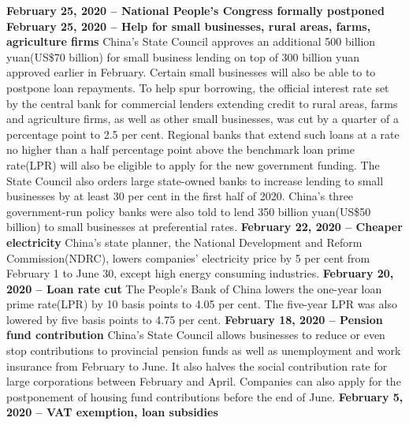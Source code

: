\documentclass[11pt, a4paper]{article}
\begin{document}
            \bigbreak
            \noindent
            \textbf{February 25, 2020 – National People’s Congress formally postponed}
            \bigbreak
            \noindent
            \textbf{\Large February 25, 2020 – Help for small businesses, rural areas, farms, agriculture firms}
            \bigbreak
            China’s State Council approves an additional 500 billion yuan(US\$70 billion) for small business lending on top of 300 billion yuan approved earlier in February. Certain small businesses will also be able to to postpone loan repayments.
            \bigbreak
            To help spur borrowing, the official interest rate set by the central bank for commercial lenders extending credit to rural areas, farms and agriculture firms, as well as other small businesses, was cut by a quarter of a percentage point to 2.5 per cent. Regional banks that extend such loans at a rate no higher than a half percentage point above the benchmark loan prime rate(LPR) will also be eligible to apply for the new government funding.
            \bigbreak
            The State Council also orders large state-owned banks to increase lending to small businesses by at least 30 per cent in the first half of 2020. China’s three government-run policy banks were also told to lend 350 billion yuan(US\$50 billion) to small businesses at preferential rates.
            \bigbreak
            \noindent
            \textbf{February 22, 2020 – Cheaper electricity}
            \bigbreak
            China’s state planner, the National Development and Reform Commission(NDRC), lowers companies’ electricity price by 5 per cent from February 1 to June 30, except high energy consuming industries.
            \bigbreak
            \noindent
            \textbf{February 20, 2020 – Loan rate cut}
            \bigbreak
            The People’s Bank of China lowers the one-year loan prime rate(LPR) by 10 basis points to 4.05 per cent. The five-year LPR was also lowered by five basis points to 4.75 per cent.
            \bigbreak
            \noindent
            \textbf{February 18, 2020 – Pension fund contribution}
            \bigbreak
            China’s State Council ﻿allows businesses to reduce or even stop contributions to provincial pension funds as well as unemployment and work insurance from February to June. It also halves the social contribution rate for large corporations between February and April. Companies can also apply for the postponement of housing fund contributions before the end of June.
            \bigbreak
            \noindent
            \textbf{February 5, 2020 – VAT exemption, loan subsidies}
\end{document}
